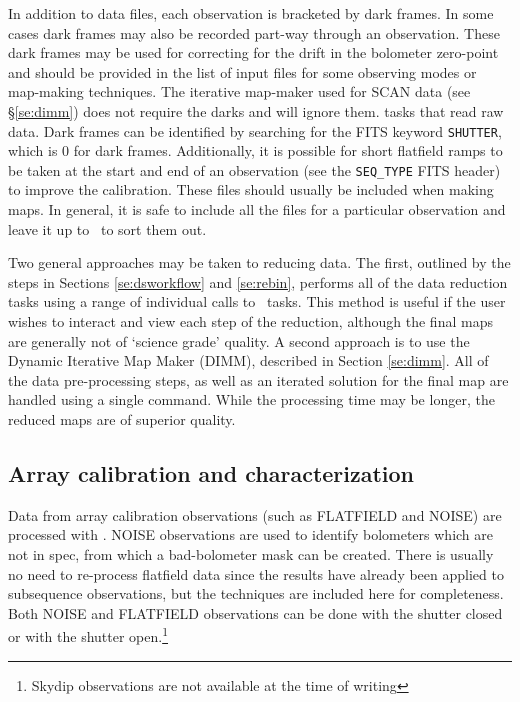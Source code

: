 \documentclass[oneside,11pt]{starlink}
\begin{document}
In addition to data files, each observation is bracketed by dark
frames. In some cases dark frames may also be recorded part-way
through an observation. These dark frames may be used for correcting
for the drift in the bolometer zero-point and should be provided in
the list of input files for some observing modes or map-making
techniques. The iterative map-maker used for SCAN data (see
\S\ref{se:dimm}) does not require the darks and will ignore them.
 tasks that read raw data. Dark frames can be identified by searching
 for the FITS keyword \texttt{SHUTTER}, which is 0 for dark
 frames. Additionally, it is possible for short flatfield ramps to be
 taken at the start and end of an observation (see the
 \texttt{SEQ\_TYPE} FITS header) to improve the calibration. These
 files should usually be included when making maps. In general, it is
 safe to include all the files for a particular observation and leave
 it up to \SMURF\ to sort them out.

Two general approaches may be taken to reducing data. The first,
outlined by the steps in Sections \ref{se:dsworkflow} and
\ref{se:rebin}, performs all of the data reduction tasks using a range
of individual calls to \SMURF\ tasks. This method is useful if the user
wishes to interact and view each step of the reduction, although the final
maps are generally not of `science grade' quality. A second approach is to
use the Dynamic Iterative Map Maker (DIMM), described in Section
\ref{se:dimm}. All of the data pre-processing steps, as well as an
iterated solution for the final map are handled using a single
command. While the processing time may be longer, the reduced maps are
of superior quality.

\subsection{Array calibration and characterization\label{se:arraycal}}

Data from array calibration observations (such as FLATFIELD and NOISE)
are processed with \SMURF. NOISE observations are used to identify
bolometers which are not in spec, from which a bad-bolometer mask can
be created. There is usually no need to re-process flatfield data
since the results have already been applied to subsequence observations, but
the techniques are included here for completeness. Both NOISE and
FLATFIELD observations can be done with the shutter closed or with the
shutter open.\footnote{Skydip observations are not available at the
  time of writing}
\end{document}
